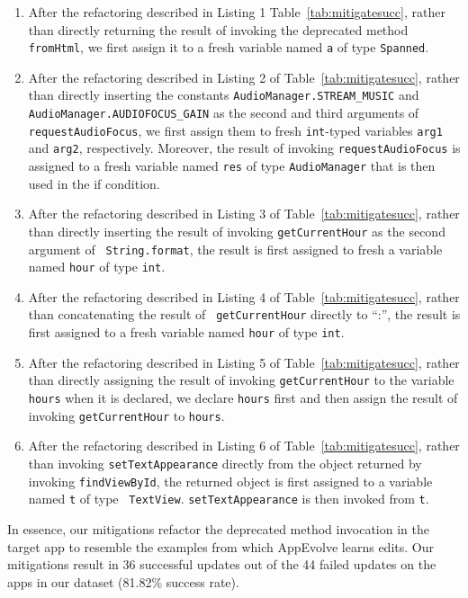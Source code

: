 \begin{enumerate}
\item After the refactoring described in Listing 1
Table~\ref{tab:mitigatesucc}, rather than directly returning the result of
invoking the deprecated method {\tt fromHtml}, we first assign it to a fresh
variable named {\tt a} of type {\tt Spanned}.

\item After the refactoring described in Listing 2 of
Table~\ref{tab:mitigatesucc}, rather than directly inserting the constants
{\tt AudioManager.STREAM\_MUSIC} and {\tt AudioManager.AUDIOFOCUS\_GAIN} as
the second and third arguments of {\tt requestAudioFocus}, we first assign
them to fresh {\tt int}-typed variables {\tt arg1} and {\tt arg2},
respectively. Moreover, the result of invoking {\tt requestAudioFocus} is
assigned to a fresh variable named {\tt res} of type {\tt AudioManager}
that is then used in the if condition.

\item After the refactoring described in Listing 3 of
Table~\ref{tab:mitigatesucc}, rather than directly inserting the result of
invoking {\tt getCurrentHour} as the second argument of {\tt
String.format}, the result is first assigned to fresh a variable named {\tt hour}
of type {\tt int}.

\item After the refactoring described in Listing 4 of
Table~\ref{tab:mitigatesucc}, rather than concatenating the result of {\tt
getCurrentHour} directly to ``:'', the result is first assigned to a fresh
variable named {\tt hour} of type {\tt int}.

\item After the refactoring described in Listing 5 of
Table~\ref{tab:mitigatesucc}, rather than directly assigning the result of
invoking {\tt getCurrentHour} to the variable {\tt hours} when it is
declared, we declare {\tt hours} first and then assign the result of
invoking {\tt getCurrentHour} to {\tt hours}.

\item After the refactoring described in Listing 6 of
Table~\ref{tab:mitigatesucc}, rather than invoking {\tt setTextAppearance}
directly from the object returned by invoking {\tt findViewById}, the
returned object is first assigned to a variable named {\tt t} of type {\tt
TextView}. {\tt setTextAppearance} is then invoked from {\tt t}.

\end{enumerate}

In essence, our mitigations refactor the deprecated method invocation in
the target app to resemble the examples from which AppEvolve learns
edits. Our mitigations result in 36 successful updates out of the 44 failed
updates on the apps in our dataset (81.82\% success rate).
